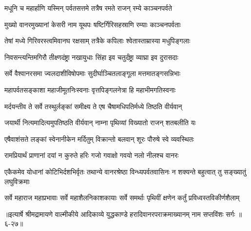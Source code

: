 \twolineshloka
{मधूनि च महार्हाणि यस्मिन् पर्वतसत्तमे}
{तत्रैष रमते राजन् रम्ये काञ्चनपर्वते} %

\twolineshloka
{मुख्यो वानरमुख्यानां केसरी नाम यूथपः}
{षष्टिर्गिरिसहस्राणि रम्याः काञ्चनपर्वताः} %

\twolineshloka
{तेषां मध्ये गिरिवरस्त्वमिवानघ रक्षसाम्}
{तत्रैके कपिलाः श्वेतास्ताम्रास्या मधुपिङ्गलाः} %

\twolineshloka
{निवसन्त्यन्तिमगिरौ तीक्ष्णदंष्ट्रा नखायुधाः}
{सिंहा इव चतुर्दंष्ट्रा व्याघ्रा इव दुरासदाः} %

\twolineshloka
{सर्वे वैश्वानरसमा ज्वलदाशीविषोपमाः}
{सुदीर्घाञ्चितलाङ्गूला मत्तमातङ्गसन्निभाः} %

\twolineshloka
{महापर्वतसङ्काशा महाजीमूतनिःस्वनाः}
{वृत्तपिङ्गलनेत्रा हि महाभीमगतिस्वनाः} %

\twolineshloka
{मर्दयन्तीव ते सर्वे तस्थुर्लङ्कां समीक्ष्य ते}
{एष चैषामधिपतिर्मध्ये तिष्ठति वीर्यवान्} %

\twolineshloka
{जयार्थी नित्यमादित्यमुपतिष्ठति वीर्यवान्}
{नाम्ना पृथिव्यां विख्यातो राजन् शतबलीति यः} %

\twolineshloka
{एषैवाशंसते लङ्कां स्वेनानीकेन मर्दितुम्}
{विक्रान्तो बलवान् शूरः पौरुषे स्वे व्यवस्थितः} %

\twolineshloka
{रामप्रियार्थं प्राणानां दयां न कुरुते हरिः}
{गजो गवाक्षो गवयो नलो नीलश्च वानरः} %

\threelineshloka
{एकैकमेव योधानां कोटिभिर्दशभिर्वृतः}
{तथान्ये वानरश्रेष्ठा विन्ध्यपर्वतवासिनः}
{न शक्यन्ते बहुत्वात् तु सङ्ख्यातुं लघुविक्रमाः} %

\twolineshloka
{सर्वे महाराज महाप्रभावाः सर्वे महाशैलनिकाशकायाः}
{सर्वे समर्थाः पृथिवीं क्षणेन कर्तुं प्रविध्वस्तविकीर्णशैलाम्} %


॥इत्यार्षे श्रीमद्रामायणे वाल्मीकीये आदिकाव्ये युद्धकाण्डे हरादिवानरपराक्रमाख्यानम् नाम सप्तविंशः सर्गः ॥६-२७॥
